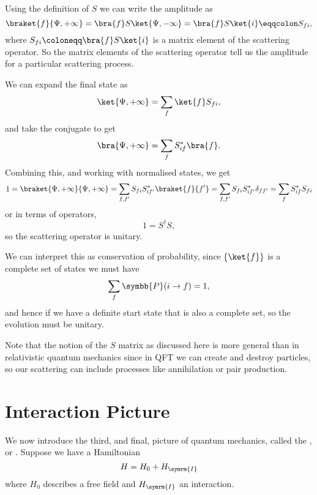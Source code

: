 \documentclass[fleqn]{NotesClass}
\newcommand{\hermit}{{\dagger}}
\newcommand{\ident}{1}
\newcommand{\interaction}{\symrm{I}}
\newcommand{\probability}{\symbb{P}}
\begin{document}
    Using the definition of \(S\) we can write the amplitude as
    \begin{equation}
        \braket{f}{\Psi, +\infty} = \bra{f} S \ket{\Psi, -\infty} = \bra{f} S \ket{i} \eqqcolon S_{fi},
    \end{equation}
    where \(S_{fi} \coloneqq \bra{f}S\ket{i}\) is a matrix element of the scattering operator.
    So the matrix elements of the scattering operator tell us the amplitude for a particular scattering process.
    
    We can expand the final state as
    \begin{equation}
        \ket{\Psi, +\infty} = \sum_f \ket{f} S_{fi},
    \end{equation}
    and take the conjugate to get
    \begin{equation}
        \bra{\Psi, +\infty} = \sum_f S_{if}^*\bra{f}.
    \end{equation}
    Combining this, and working with normalised states, we get
    \begin{equation}
        1 = \braket{\Psi, +\infty}{\Psi, +\infty} = \sum_{f, f'} S_{fi}S_{if'}^{*} \braket{f}{f'} = \sum_{f, f'} S_{fi}S_{if'}^*\delta_{ff'} = \sum_{f} S_{if}^*S_{fi}
    \end{equation}
    or in terms of operators,
    \begin{equation}
        \ident = S^\hermit S,
    \end{equation}
    so the scattering operator is unitary.
    
    We can interpret this as conservation of probability, since \(\{\ket{f}\}\) is a complete set of states we must have 
    \begin{equation}
        \sum_{f} \probability(i \to f) = 1,
    \end{equation}
    and hence if we have a definite start state that is also a complete set, so the evolution must be unitary.
    
    Note that the notion of the \(S\) matrix as discussed here is more general than in relativistic quantum mechanics since in QFT we can create and destroy particles, so our scattering can include processes like annihilation or pair production.
    
    \section{Interaction Picture}
    We now introduce the third, and final, picture of quantum mechanics, called the , or .
    Suppose we have a Hamiltonian
    \begin{equation}
        H = H_0 + H_{\interaction}
    \end{equation}
    where \(H_0\) describes a free field and \(H_{\interaction}\) an interaction.
    
\end{document}
